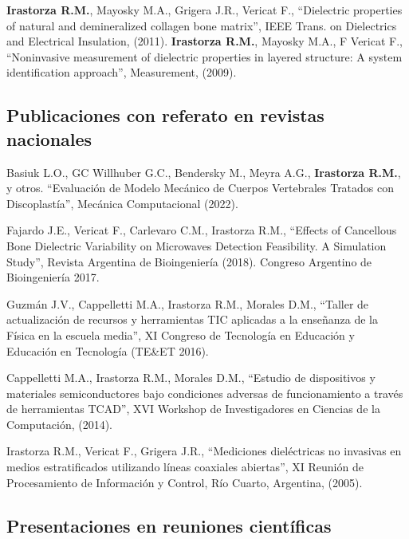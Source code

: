 \documentclass[margin,line]{res}
\begin{document}
\begin{resume}
\textbf{Irastorza R.M.}, Mayosky M.A., Grigera J.R., Vericat F., ``Dielectric properties of natural and demineralized collagen bone matrix'', IEEE Trans. on Dielectrics and Electrical Insulation, (2011).
%
%
{\bf Irastorza R.M.}, Mayosky M.A., F Vericat F., ``Noninvasive measurement of dielectric properties in layered structure: A system identification approach'', Measurement, (2009).

\subsection{ Publicaciones con referato en revistas nacionales}

Basiuk L.O., GC Willhuber G.C., Bendersky M., Meyra A.G., \textbf{Irastorza R.M.}, y otros. ``Evaluación de Modelo Mecánico de Cuerpos Vertebrales Tratados con Discoplastía'', Mecánica Computacional (2022).

Fajardo J.E., Vericat F., Carlevaro C.M., Irastorza R.M., ``Effects of Cancellous Bone Dielectric Variability on Microwaves Detection Feasibility. A Simulation Study'', Revista Argentina de Bioingeniería  (2018). Congreso Argentino de Bioingeniería 2017.

Guzmán J.V., Cappelletti M.A., Irastorza R.M., Morales D.M., ``Taller de actualización de recursos y herramientas TIC aplicadas a la enseñanza de la Física en la escuela media'', XI Congreso de Tecnología en Educación y Educación en Tecnología (TE\&ET 2016).

Cappelletti M.A., Irastorza R.M., Morales D.M., ``Estudio de dispositivos y materiales semiconductores bajo condiciones adversas de funcionamiento a través de herramientas TCAD'', XVI Workshop de Investigadores en Ciencias de la Computación, (2014).

Irastorza R.M., Vericat F., Grigera J.R., ``Mediciones dieléctricas no invasivas en medios estratificados utilizando líneas coaxiales abiertas'', XI Reunión de Procesamiento de Información y Control, Río Cuarto, Argentina, (2005).

\subsection{ Presentaciones en reuniones científicas}


\end{resume}
\end{document}
